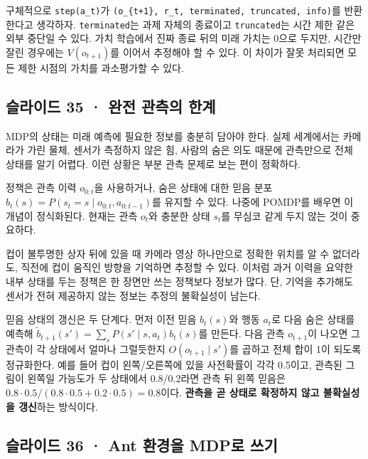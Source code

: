 \documentclass[11pt,a4paper]{article}
\begin{document}
구체적으로 \texttt{step(a\_\allowbreak{}t)}가 \texttt{(o\_\allowbreak{}\{t+1\},\allowbreak{} r\_\allowbreak{}t,\allowbreak{} terminated,\allowbreak{} truncated,\allowbreak{} info)}를 반환한다고 생각하자. \texttt{terminated}는 과제 자체의 종료이고 \texttt{truncated}는 시간 제한 같은 외부 중단일 수 있다. 가치 학습에서 진짜 종료 뒤의 미래 가치는 0으로 두지만, 시간만 잘린 경우에는 $V(o_{t+1})$를 이어서 추정해야 할 수 있다. 이 차이가 잘못 처리되면 모든 제한 시점의 가치를 과소평가할 수 있다.\par

\subsection{슬라이드 35 · 완전 관측의 한계}

MDP의 상태는 미래 예측에 필요한 정보를 충분히 담아야 한다. 실제 세계에서는 카메라가 가린 물체, 센서가 측정하지 않은 힘, 사람의 숨은 의도 때문에 관측만으로 전체 상태를 알기 어렵다. 이런 상황은 부분 관측 문제로 보는 편이 정확하다.\par

정책은 관측 이력 $o_{0:t}$을 사용하거나, 숨은 상태에 대한 믿음 분포 $b_t(s)=P(s_t=s\mid o_{0:t},a_{0:t-1})$를 유지할 수 있다. 나중에 POMDP를 배우면 이 개념이 정식화된다. 현재는 관측 $o_t$와 충분한 상태 $s_t$를 무심코 같게 두지 않는 것이 중요하다.\par

컵이 불투명한 상자 뒤에 있을 때 카메라 영상 하나만으로 정확한 위치를 알 수 없더라도, 직전에 컵이 움직인 방향을 기억하면 추정할 수 있다. 이처럼 과거 이력을 요약한 내부 상태를 두는 정책은 한 장면만 쓰는 정책보다 정보가 많다. 단, 기억을 추가해도 센서가 전혀 제공하지 않는 정보는 추정의 불확실성이 남는다.\par

믿음 상태의 갱신은 두 단계다. 먼저 이전 믿음 $b_t(s)$와 행동 $a_t$로 다음 숨은 상태를 예측해 $\widetilde b_{t+1}(s')=\sum_sP(s'\mid s,a_t)b_t(s)$를 만든다. 다음 관측 $o_{t+1}$이 나오면 그 관측이 각 상태에서 얼마나 그럴듯한지 $O(o_{t+1}\mid s')$를 곱하고 전체 합이 1이 되도록 정규화한다. 예를 들어 컵이 왼쪽/오른쪽에 있을 사전확률이 각각 0.5이고, 관측된 그림이 왼쪽일 가능도가 두 상태에서 0.8/0.2라면 관측 뒤 왼쪽 믿음은 $0.8\cdot0.5/(0.8\cdot0.5+0.2\cdot0.5)=0.8$이다. \textbf{관측을 곧 상태로 확정하지 않고 불확실성을 갱신}하는 방식이다.\par

\subsection{슬라이드 36 · Ant 환경을 MDP로 쓰기}
\end{document}
